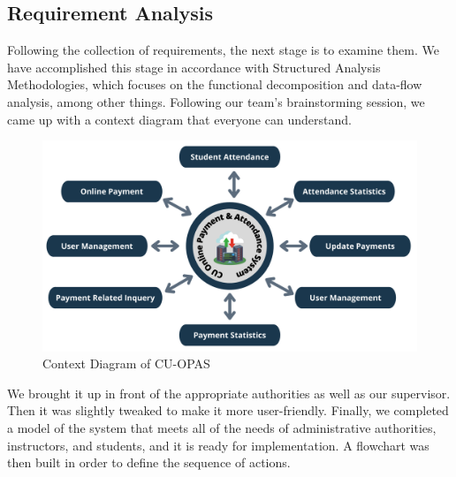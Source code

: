\subsection{Requirement Analysis}\label{sub: reqana}
Following the collection of requirements, the next stage is to examine them. We have accomplished this stage in accordance with Structured Analysis Methodologies, which focuses on the functional decomposition and data-flow analysis, among other things. Following our team's brainstorming session, we came up with a context diagram that everyone can understand.\\
\begin{figure}[H]
    \centering
    \includegraphics[width=1\textwidth]{images/context}
    \caption{Context Diagram of CU-OPAS}
    \label{fig:context}
\end{figure}
We brought it up in front of the appropriate authorities as well as our supervisor. Then it was slightly tweaked to make it more user-friendly. Finally, we completed a model of the system that meets all of the needs of administrative authorities, instructors, and students, and it is ready for implementation. A flowchart was then built in order to define the sequence of actions.\\
